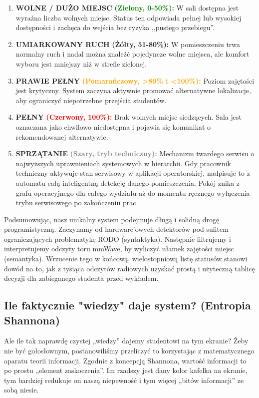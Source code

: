 \documentclass[14pt,a4paper]{extarticle}
\begin{document}
\begin{enumerate}
    \item \textbf{WOLNE / DUŻO MIEJSC} \textcolor{green}{\textbf{(Zielony, 0-50\%):}} W sali dostępna jest wyraźna liczba wolnych miejsc. Status ten odpowiada pełnej lub wysokiej dostępności i zachęca do wejścia bez ryzyka ,,pustego przebiegu''.
    \item \textbf{UMIARKOWANY RUCH} \textcolor{yellow!60!black}{\textbf{(Żółty, 51-80\%):}} W pomieszczeniu trwa normalny ruch i nadal można znaleźć pojedyncze wolne miejsca, ale komfort wyboru jest mniejszy niż w strefie zielonej.
    \item \textbf{PRAWIE PEŁNY} \textcolor{orange}{\textbf{(Pomarańczowy, >80\% i <100\%):}} Poziom zajętości jest krytyczny. System zaczyna aktywnie promować alternatywne lokalizacje, aby ograniczyć niepotrzebne przejścia studentów.
    \item \textbf{PEŁNY} \textcolor{red}{\textbf{(Czerwony, 100\%):}} Brak wolnych miejsc siedzących. Sala jest oznaczana jako chwilowo niedostępna i pojawia się komunikat o rekomendowanej alternatywie.
    \item \textbf{SPRZĄTANIE} \textcolor{gray}{\textbf{(Szary, tryb techniczny):}} Mechanizm twardego serwisu o najwyższych uprawnieniach systemowych w hierarchii. Gdy pracownik techniczny aktywuje stan serwisowy w aplikacji operatorskiej, nadpisuje to z automatu całą inteligentną detekcję danego pomieszczenia. Pokój znika z grafu operacyjnego dla całego wydziału aż do momentu ręcznego wyłączenia trybu serwisowego po zakończeniu prac.
\end{enumerate}

Podsumowując, nasz unikalny system podejmuje długą i solidną drogę programistyczną. Zaczynamy od hardware'owych detektorów pod sufitem ograniczających problematykę RODO (syntaktyka). Następnie filtrujemy i interpretujemy odczyty toru mmWave, by wyliczyć ułamek zajętości miejsc (semantyka). Wrzucenie tego w końcową, wielostopniową listę statusów stanowi dowód na to, jak z tysiąca odczytów radiowych uzyskać prostą i użyteczną tablicę decyzji dla zabieganego studenta przed wykładem.
\subsection{Ile faktycznie "wiedzy" daje system? (Entropia Shannona)}
Ale ile tak naprawdę czystej „wiedzy” dajemy studentowi na tym ekranie? Żeby nie być gołosłownym, postanowiliśmy przeliczyć to korzystając z matematycznego aparatu teorii informacji. Zgodnie z koncepcją Shannona, wartość informacji to po prostu „element zaskoczenia”. Im rzadszy jest dany kolor kafelka na ekranie, tym bardziej redukuje on naszą niepewność i tym więcej „bitów informacji” ze sobą niesie.
\end{document}
